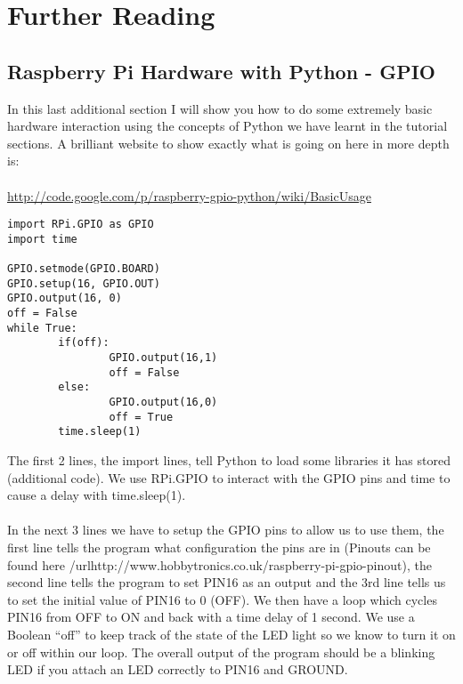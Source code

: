 \documentclass[twocolumn]{article}
\begin{document}
\section{Further Reading}

\subsection{Raspberry Pi Hardware with Python - GPIO}

In this last additional section I will show you how to do some extremely basic hardware interaction using the concepts of Python we have learnt in the tutorial sections. A brilliant website to show exactly what is going on here in more depth is:\\
\\ \url{http://code.google.com/p/raspberry-gpio-python/wiki/BasicUsage}
\begin{lstlisting}
import RPi.GPIO as GPIO
import time

GPIO.setmode(GPIO.BOARD)
GPIO.setup(16, GPIO.OUT)
GPIO.output(16, 0)
off = False
while True:
        if(off):
                GPIO.output(16,1)
                off = False
        else:
                GPIO.output(16,0)
                off = True
        time.sleep(1)
\end{lstlisting}
The first 2 lines, the import lines, tell Python to load some libraries it has stored (additional code). We use RPi.GPIO to interact with the GPIO pins and time to cause a delay with time.sleep(1).\\
\\
In the next 3 lines we have to setup the GPIO pins to allow us to use them, the first line tells the program what configuration the pins are in (Pinouts can be found here /url{http://www.hobbytronics.co.uk/raspberry-pi-gpio-pinout}), the second line tells the program to set PIN16 as an output and the 3rd line tells us to set the initial value of PIN16 to 0 (OFF). We then have a loop which cycles PIN16 from OFF to ON and back with a time delay of 1 second. We use a Boolean ``off'' to keep track of the state of the LED light so we know to turn it on or off within our loop. The overall output of the program should be a blinking LED if you attach an LED correctly to PIN16 and GROUND.
\end{document}

